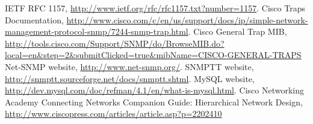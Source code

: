 \documentclass[10pt,a4paper]{report}
\begin{document}
 \begin{thebibliography}{9}
IETF RFC 1157, \url{http://www.ietf.org/rfc/rfc1157.txt?number=1157}.
Cisco Traps Documentation, \url{http://www.cisco.com/c/en/us/support/docs/ip/simple-network-management-protocol-snmp/7244-snmp-trap.html}.
Cisco General Trap MIB, \url{http://tools.cisco.com/Support/SNMP/do/BrowseMIB.do?local=en&step=2&submitClicked=true&mibName=CISCO-GENERAL-TRAPS}
Net-SNMP website, \url{http://www.net-snmp.org/}.
SNMPTT website, \url{http://snmptt.sourceforge.net/docs/snmptt.shtml}.
MySQL website, \url{http://dev.mysql.com/doc/refman/4.1/en/what-is-mysql.html}.
Cisco Networking Academy Connecting Networks Companion Guide: Hierarchical Network Design, \url{http://www.ciscopress.com/articles/article.asp?p=2202410}

 
\end{thebibliography}
    
\end{document}
